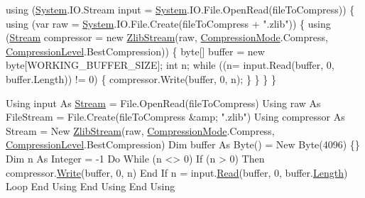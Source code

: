 \begin{DoxyCode}
\textcolor{keyword}{using} (\mbox{\hyperlink{namespace_system}{System}}.IO.Stream input = \mbox{\hyperlink{namespace_system}{System}}.IO.File.OpenRead(fileToCompress))
\{
    \textcolor{keyword}{using} (var raw = \mbox{\hyperlink{namespace_system}{System}}.IO.File.Create(fileToCompress + \textcolor{stringliteral}{".zlib"}))
    \{
        \textcolor{keyword}{using} (\mbox{\hyperlink{namespace_super_tiled2_unity_1_1_ionic_1_1_zip_a9ced5352c56e7e0fceff15b534073c83aeae835e83c0494a376229f254f7d3392}{Stream}} compressor = \textcolor{keyword}{new} \mbox{\hyperlink{class_super_tiled2_unity_1_1_ionic_1_1_zlib_1_1_zlib_stream_a626c8b9a6ae8fffc521a24efc94f6f39}{ZlibStream}}(raw,
                                                  \mbox{\hyperlink{namespace_super_tiled2_unity_1_1_ionic_1_1_zlib_ad5b7635d92497e1c905e5de82eb1c6b1}{CompressionMode}}.Compress,
                                                  \mbox{\hyperlink{namespace_super_tiled2_unity_1_1_ionic_1_1_zlib_a20f6771804996c363f454ad9765cd7db}{CompressionLevel}}.BestCompression))
        \{
            byte[] buffer = \textcolor{keyword}{new} byte[WORKING\_BUFFER\_SIZE];
            \textcolor{keywordtype}{int} n;
            \textcolor{keywordflow}{while} ((n= input.Read(buffer, 0, buffer.Length)) != 0)
            \{
                compressor.Write(buffer, 0, n);
            \}
        \}
    \}
\}
\end{DoxyCode}



\begin{DoxyCode}
Using input As \mbox{\hyperlink{namespace_super_tiled2_unity_1_1_ionic_1_1_zip_a9ced5352c56e7e0fceff15b534073c83aeae835e83c0494a376229f254f7d3392}{Stream}} = File.OpenRead(fileToCompress)
    Using raw As FileStream = File.Create(fileToCompress &amp; \textcolor{stringliteral}{".zlib"})
        Using compressor As Stream = New \mbox{\hyperlink{class_super_tiled2_unity_1_1_ionic_1_1_zlib_1_1_zlib_stream_a626c8b9a6ae8fffc521a24efc94f6f39}{ZlibStream}}(raw, 
      \mbox{\hyperlink{namespace_super_tiled2_unity_1_1_ionic_1_1_zlib_ad5b7635d92497e1c905e5de82eb1c6b1}{CompressionMode}}.Compress, \mbox{\hyperlink{namespace_super_tiled2_unity_1_1_ionic_1_1_zlib_a20f6771804996c363f454ad9765cd7db}{CompressionLevel}}.BestCompression)
            Dim buffer As Byte() = New Byte(4096) \{\}
            Dim n As Integer = -1
            Do While (n <> 0)
                If (n > 0) Then
                    compressor.\mbox{\hyperlink{class_super_tiled2_unity_1_1_ionic_1_1_zlib_1_1_zlib_stream_a042abef8f9aa0d0043e6081d9de7dea7}{Write}}(buffer, 0, n)
                End If
                n = input.\mbox{\hyperlink{class_super_tiled2_unity_1_1_ionic_1_1_zlib_1_1_zlib_stream_a0987720c2d2c6219e1f1cbd9ae8ee818}{Read}}(buffer, 0, buffer.\mbox{\hyperlink{class_super_tiled2_unity_1_1_ionic_1_1_zlib_1_1_zlib_stream_a54ad4fbbd65e5e04fc2b714067f77fba}{Length}})
            Loop
        End Using
    End Using
End Using
\end{DoxyCode}
 


